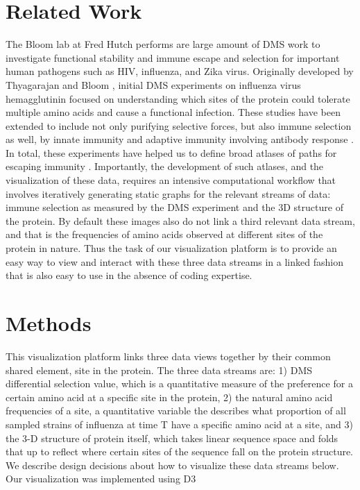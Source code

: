 \documentclass[sigchi]{acmart}
\begin{document}
\section{Related Work}
The Bloom lab at Fred Hutch performs are large amount of DMS work to investigate functional stability and immune escape and selection for important human pathogens such as HIV, influenza, and Zika virus. Originally developed by Thyagarajan and Bloom \cite{thyagarajan2014inherent}, initial DMS experiments on influenza virus hemagglutinin focused on understanding which sites of the protein could tolerate multiple amino acids and cause a functional infection. These studies have been extended to include not only purifying selective forces, but also immune selection as well, by innate immunity \cite{ashenberg2017deep} and adaptive immunity involving antibody response \cite{Lee2018}. In total, these experiments have helped us to define broad atlases of paths for escaping immunity \cite{dingens2019antigenic}. Importantly, the development of such atlases, and the visualization of these data, requires an intensive computational workflow that involves iteratively generating static graphs for the relevant streams of data: immune selection as measured by the DMS experiment and the 3D structure of the protein. By default these images also do not link a third relevant data stream, and that is the frequencies of amino acids observed at different sites of the protein in nature. Thus the task of our visualization platform is to provide an easy way to view and interact with these three data streams in a linked fashion that is also easy to use in the absence of coding expertise.

\section{Methods}
This visualization platform links three data views together by their common shared element, site in the protein. The three data streams are: 1) DMS differential selection value, which is a quantitative measure of the preference for a certain amino acid at a specific site in the protein, 2) the natural amino acid frequencies of a site, a quantitative variable the describes what proportion of all sampled strains of influenza at time T have a specific amino acid at a site, and 3) the 3-D structure of protein itself, which takes linear sequence space and folds that up to reflect where certain sites of the sequence fall on the protein structure. We describe design decisions about how to visualize these data streams below. Our visualization was implemented using D3 \cite{bostock2011d3}
\end{document}

